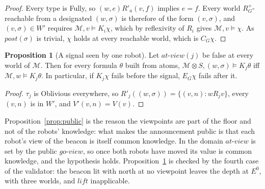 \documentclass[11pt,a4paper]{article}
\theoremstyle{definition}
\newtheorem{proposition}{Proposition}
\newcommand{\Mod}{\mathcal{M}}
\newcommand{\prd}{\otimes}
\newcommand{\Kop}[1]{K_{#1}}
\newcommand{\Eop}[1]{E_{#1}}
\newcommand{\Cop}[1]{C_{#1}}
\newcommand{\post}{\mathit{post}}
\newcommand{\atview}{\mathit{at\text{-}view}}
\begin{document}
\begin{proof}
Every type is Fully, so $(w,e) R'_a (v,f)$ implies $e = f$. Every world
$R_G^+$-reachable from a designated $(w,\sigma)$ is therefore of the form
$(v,\sigma)$, and $(v,\sigma) \in W'$ requires $\Mod, v \models \Kop{i}\chi$,
which by reflexivity of $R_i$ gives $\Mod, v \models \chi$. As $\post(\sigma)$
is trivial, $\chi$ holds at every reachable world, which is
$\Cop{G}\chi$.
\end{proof}

\begin{proposition}[A signal seen by one robot]
\label{prop:alone}
Let $\atview(j)$ be false at every world of $\Mod$. Then for every formula
$\theta$ built from atoms,
$\Mod \prd S, (w,\sigma) \models \Kop{j}\theta$ iff $\Mod, w \models \Kop{j}\theta$.
In particular, if $\Kop{j}\chi$ fails before the signal, $\Eop{G}\chi$ fails
after it.
\end{proposition}

\begin{proof}
$\tau_j$ is Oblivious everywhere, so $R'_j((w,\sigma)) = \{(v,n) : w R_j v\}$,
every $(v,n)$ is in $W'$, and $V'(v,n) = V(v)$.
\end{proof}

\noindent
Proposition~\ref{prop:public} is the reason the viewpoints are part of the
floor and not of the robots' knowledge: what makes the announcement public is
that each robot's view of the beacon is itself common knowledge. In the domain
$\atview$ is set by the public $\mathit{go\text{-}view}$, so once both robots
have moved its value is common knowledge, and the hypothesis holds.
Proposition~\ref{prop:alone} is checked by the fourth case of the validator: the
beacon lit with north at no viewpoint leaves the depth at $E^0$, with three
worlds, and $\mathit{lift}$ inapplicable.
\end{document}
